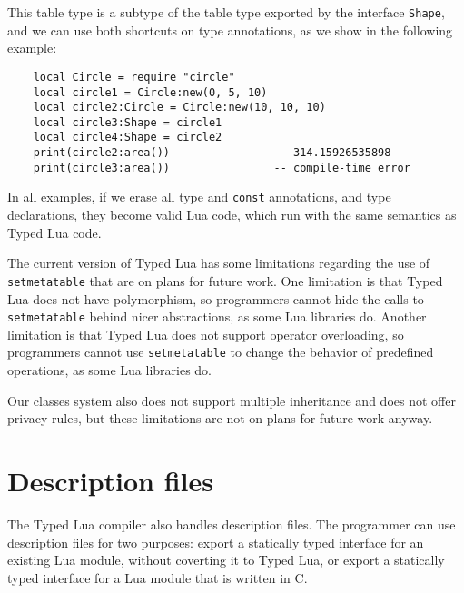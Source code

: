This table type is a subtype of the table type exported by the interface \texttt{Shape},
and we can use both shortcuts on type annotations, as we show in the following example:
\begin{verbatim}
    local Circle = require "circle"
    local circle1 = Circle:new(0, 5, 10)
    local circle2:Circle = Circle:new(10, 10, 10)
    local circle3:Shape = circle1
    local circle4:Shape = circle2
    print(circle2:area())                -- 314.15926535898
    print(circle3:area())                -- compile-time error
\end{verbatim}

In all examples, if we erase all type and \texttt{const} annotations,
and type declarations, they become valid Lua code, which run with the
same semantics as Typed Lua code.

The current version of Typed Lua has some limitations regarding
the use of \texttt{setmetatable} that are on plans for future work.
One limitation is that Typed Lua does not have polymorphism,
so programmers cannot hide the calls to \texttt{setmetatable} behind
nicer abstractions, as some Lua libraries do.
Another limitation is that Typed Lua does not support operator overloading,
so programmers cannot use \texttt{setmetatable} to change the behavior
of predefined operations, as some Lua libraries do.

Our classes system also does not support multiple inheritance
and does not offer privacy rules, but these limitations are not
on plans for future work anyway.

\section{Description files}

The Typed Lua compiler also handles description files.
The programmer can use description files for two purposes:
export a statically typed interface for an existing Lua
module, without coverting it to Typed Lua,
or export a statically typed interface for a Lua module
that is written in C.

